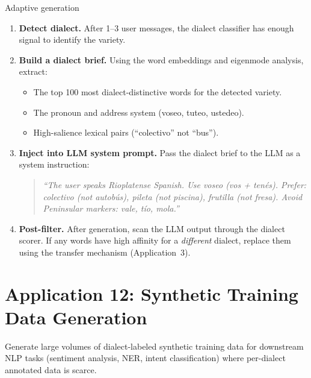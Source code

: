 \documentclass[11pt,a4paper]{article}
\begin{document}
\begin{howbox}{Adaptive generation}
\begin{enumerate}[nosep]
  \item \textbf{Detect dialect.} After 1--3 user messages, the
    dialect classifier has enough signal to identify the variety.

  \item \textbf{Build a dialect brief.} Using the word embeddings
    and eigenmode analysis, extract:
    \begin{itemize}[nosep]
      \item The top 100 most dialect-distinctive words for the
        detected variety.
      \item The pronoun and address system (voseo, tuteo, ustedeo).
      \item High-salience lexical pairs (``colectivo'' not ``bus'').
    \end{itemize}

  \item \textbf{Inject into LLM system prompt.} Pass the dialect
    brief to the LLM as a system instruction:
    \begin{quote}\small\itshape
    ``The user speaks Rioplatense Spanish. Use voseo (vos + ten\'es).
    Prefer: colectivo (not autob\'us), pileta (not piscina), frutilla
    (not fresa). Avoid Peninsular markers: vale, tío, mola.''
    \end{quote}

  \item \textbf{Post-filter.} After generation, scan the LLM output
    through the dialect scorer. If any words have high affinity for a
    \emph{different} dialect, replace them using the transfer mechanism
    (Application~3).
\end{enumerate}
\end{howbox}

\section{Application 12: Synthetic Training Data Generation}
\label{sec:app-synthetic}

\begin{appbox}
Generate large volumes of dialect-labeled synthetic training data for
downstream NLP tasks (sentiment analysis, NER, intent classification)
where per-dialect annotated data is scarce.
\end{appbox}
\end{document}
